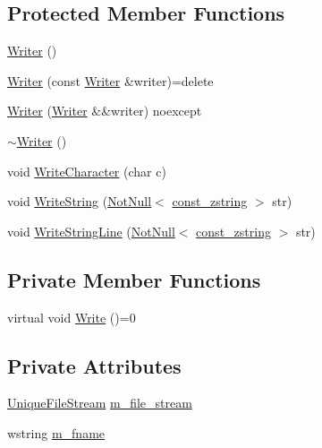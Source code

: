 \subsection*{Protected Member Functions}
\begin{DoxyCompactItemize}
\item 
\hyperlink{classmage_1_1_writer_a40b6cd3005d509e670c5a49272d9ef27}{Writer} ()
\item 
\hyperlink{classmage_1_1_writer_a2b257938508732ca0b78241aafa7922c}{Writer} (const \hyperlink{classmage_1_1_writer}{Writer} \&writer)=delete
\item 
\hyperlink{classmage_1_1_writer_abda6f6db577201580c0e97c0816e0d3f}{Writer} (\hyperlink{classmage_1_1_writer}{Writer} \&\&writer) noexcept
\item 
\hyperlink{classmage_1_1_writer_aeeb30d6afb1a271b4ad294889054caec}{$\sim$\+Writer} ()
\item 
void \hyperlink{classmage_1_1_writer_aa1ef04f5e69c44afda56704c2823316c}{Write\+Character} (char c)
\item 
void \hyperlink{classmage_1_1_writer_a0efdf73186727b2ae95072b62eddcf5b}{Write\+String} (\hyperlink{namespacemage_a8769f9d670d6b585ea306cb1062af94b}{Not\+Null}$<$ \hyperlink{namespacemage_abfd9206dc607ceb5d13ec68bf075a5c0}{const\+\_\+zstring} $>$ str)
\item 
void \hyperlink{classmage_1_1_writer_abdfd1361df7bb66e284d031f92c85c05}{Write\+String\+Line} (\hyperlink{namespacemage_a8769f9d670d6b585ea306cb1062af94b}{Not\+Null}$<$ \hyperlink{namespacemage_abfd9206dc607ceb5d13ec68bf075a5c0}{const\+\_\+zstring} $>$ str)
\end{DoxyCompactItemize}
\subsection*{Private Member Functions}
\begin{DoxyCompactItemize}
\item 
virtual void \hyperlink{classmage_1_1_writer_a9baf695ef7f6180bef883f60bcb3ac07}{Write} ()=0
\end{DoxyCompactItemize}
\subsection*{Private Attributes}
\begin{DoxyCompactItemize}
\item 
\hyperlink{namespacemage_a0ee1bd45ad7dbb3dc8c8e1770e3538d4}{Unique\+File\+Stream} \hyperlink{classmage_1_1_writer_ac4884215d1b547e990633474bf61c470}{m\+\_\+file\+\_\+stream}
\item 
wstring \hyperlink{classmage_1_1_writer_afa271ee47897d4961e9d62132d8faeb5}{m\+\_\+fname}
\end{DoxyCompactItemize}


